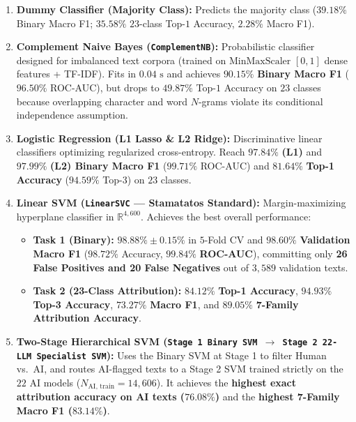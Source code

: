 \documentclass[11pt, a4paper]{article}
\begin{document}
\begin{enumerate}[itemsep=3pt]
    \item \textbf{Dummy Classifier (Majority Class):} Predicts the majority class ($39.18\%$ Binary Macro F1; $35.58\%$ $23$-class Top-$1$ Accuracy, $2.28\%$ Macro F1).
    \item \textbf{Complement Naive Bayes (\texttt{ComplementNB}):} Probabilistic classifier designed for imbalanced text corpora (trained on $\text{MinMaxScaler } [0, 1]$ dense features + TF-IDF). Fits in $0.04\text{ s}$ and achieves $\mathbf{90.15\%}$ \textbf{Binary Macro F1} ($96.50\%$ ROC-AUC), but drops to $49.87\%$ Top-$1$ Accuracy on $23$ classes because overlapping character and word $N$-grams violate its conditional independence assumption.
    \item \textbf{Logistic Regression (L1 Lasso \& L2 Ridge):} Discriminative linear classifiers optimizing regularized cross-entropy. Reach $\mathbf{97.84\%}$ \textbf{(L1)} and $\mathbf{97.99\%}$ \textbf{(L2) Binary Macro F1} ($99.71\%$ ROC-AUC) and $\mathbf{81.64\%}$ \textbf{Top-1 Accuracy} ($94.59\%$ Top-3) on $23$ classes.
    \item \textbf{Linear SVM (\texttt{LinearSVC} --- Stamatatos Standard):} Margin-maximizing hyperplane classifier in $\mathbb{R}^{4,600}$. Achieves the best overall performance:
    \begin{itemize}[noitemsep]
        \item \textbf{Task 1 (Binary):} $\mathbf{98.88\% \pm 0.15\%}$ in $5$-Fold CV and $\mathbf{98.60\%}$ \textbf{Validation Macro F1} ($98.72\%$ Accuracy, $\mathbf{99.84\%}$ \textbf{ROC-AUC}), committing only \textbf{26 False Positives and 20 False Negatives} out of $3,589$ validation texts.
        \item \textbf{Task 2 (23-Class Attribution):} $\mathbf{84.12\%}$ \textbf{Top-1 Accuracy}, $\mathbf{94.93\%}$ \textbf{Top-3 Accuracy}, $\mathbf{73.27\%}$ \textbf{Macro F1}, and $\mathbf{89.05\%}$ \textbf{7-Family Attribution Accuracy}.
    \end{itemize}
    \item \textbf{Two-Stage Hierarchical SVM (\texttt{Stage 1 Binary SVM $\to$ Stage 2 22-LLM Specialist SVM}):}
    Uses the Binary SVM at Stage 1 to filter Human vs.\ AI, and routes AI-flagged texts to a Stage 2 SVM trained strictly on the $22$ AI models ($N_{\text{AI, train}} = 14,606$). It achieves the \textbf{highest exact attribution accuracy on AI texts ($\mathbf{76.08\%}$)} and the \textbf{highest 7-Family Macro F1 ($\mathbf{83.14\%}$)}.
\end{enumerate}
\end{document}

